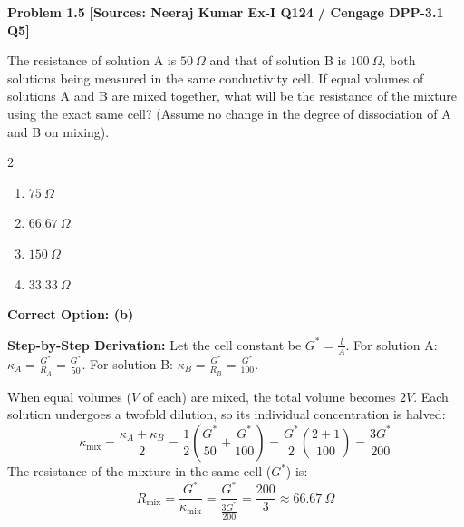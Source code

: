 \begin{problembox}
\textbf{Problem 1.5} \hfill \textbf{[Sources: Neeraj Kumar Ex-I Q124 / Cengage DPP-3.1 Q5]}

The resistance of solution A is $50\ \Omega$ and that of solution B is $100\ \Omega$, both solutions being measured in the same conductivity cell. If equal volumes of solutions A and B are mixed together, what will be the resistance of the mixture using the exact same cell? (Assume no change in the degree of dissociation of A and B on mixing).
\begin{multicols}{2}
\begin{enumerate}[label=(\alph*)]
    \item $75\ \Omega$
    \item $66.67\ \Omega$
    \item $150\ \Omega$
    \item $33.33\ \Omega$
\end{enumerate}
\end{multicols}
\end{problembox}
\begin{solution}
\textbf{Correct Option: (b)}

\textbf{Step-by-Step Derivation:}
Let the cell constant be $G^* = \frac{l}{A}$.
For solution A: $\kappa_A = \frac{G^*}{R_A} = \frac{G^*}{50}$.
For solution B: $\kappa_B = \frac{G^*}{R_B} = \frac{G^*}{100}$.

When equal volumes ($V$ of each) are mixed, the total volume becomes $2V$. Each solution undergoes a twofold dilution, so its individual concentration is halved:
\begin{equation*}
    \kappa_{\text{mix}} = \frac{\kappa_A + \kappa_B}{2} = \frac{1}{2} \left( \frac{G^*}{50} + \frac{G^*}{100} \right) = \frac{G^*}{2} \left( \frac{2 + 1}{100} \right) = \frac{3 G^*}{200}
\end{equation*}
The resistance of the mixture in the same cell ($G^*$) is:
\begin{equation*}
    R_{\text{mix}} = \frac{G^*}{\kappa_{\text{mix}}} = \frac{G^*}{\frac{3 G^*}{200}} = \frac{200}{3} \approx 66.67\ \Omega
\end{equation*}
\end{solution}

